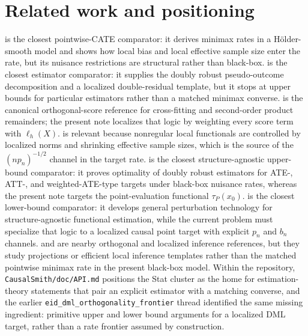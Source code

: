 \documentclass[11pt]{article}
\theoremstyle{definition}
\theoremstyle{plain}
\theoremstyle{remark}
\begin{document}
\section{Related work and positioning}
\citet{KennedyBalakrishnanRobinsWasserman2024MinimaxCATE} is the closest pointwise-CATE comparator:
it derives minimax rates in a H\"older-smooth model and shows how local bias and local effective sample
size enter the rate, but its nuisance restrictions are structural rather than black-box.
\citet{Kennedy2023DRCATE} is the closest estimator comparator: it supplies the doubly robust
pseudo-outcome decomposition and a localized double-residual template, but it stops at upper bounds for
particular estimators rather than a matched minimax converse.
\citet{ChernozhukovEtAl2018DML} is the canonical orthogonal-score reference for cross-fitting and
second-order product remainders; the present note localizes that logic by weighting every score term
with $\ell_h(X)$.
\citet{ChernozhukovNeweySingh2022LocalRiesz} is relevant because nonregular local functionals are
controlled by localized norms and shrinking effective sample sizes, which is the source of the
$(n p_n)^{-1/2}$ channel in the target rate.
\citet{JinSyrgkanis2024StructureAgnosticDR} is the closest structure-agnostic upper-bound comparator:
it proves optimality of doubly robust estimators for ATE-, ATT-, and weighted-ATE-type targets under
black-box nuisance rates, whereas the present note targets the point-evaluation functional
$\tau_P(x_0)$.
\citet{JinSyrgkanis2025GeneralLinearFunctionalLowerBounds} is the closest lower-bound comparator:
it develops general perturbation technology for structure-agnostic functional estimation, while the
current problem must specialize that logic to a localized causal point target with explicit $p_n$ and
$b_n$ channels.
\citet{SemenovaChernozhukov2021DMLCATE} and \citet{KallusMaoUehara2024LDML} are nearby orthogonal and
localized inference references, but they study projections or efficient local inference templates
rather than the matched pointwise minimax rate in the present black-box model.
Within the repository, \texttt{CausalSmith/doc/API.md} positions the Stat cluster as the home for
estimation-theory statements that pair an explicit estimator with a matching converse, and the earlier
\texttt{eid\_dml\_orthogonality\_frontier} thread identified the same missing ingredient: primitive
upper and lower bound arguments for a localized DML target, rather than a rate frontier assumed by
construction.
\end{document}

